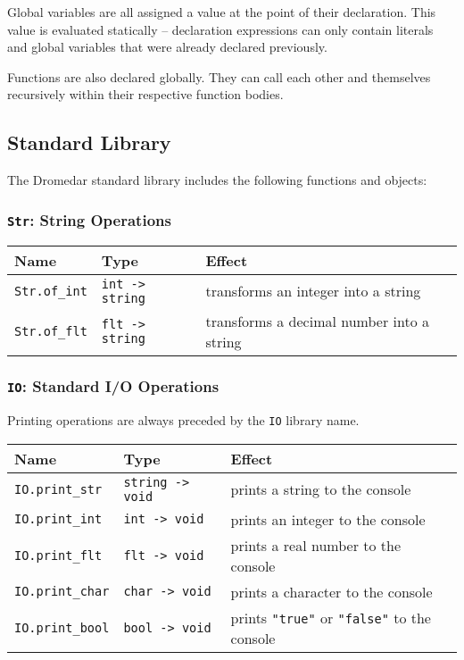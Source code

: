\documentclass{article}
\newcommand{\code}[1]{\lstinline[columns=fixed]{#1}}
\begin{document}
			Global variables are all assigned a value at the point of their declaration. This value is evaluated statically -- declaration expressions can only contain literals and global variables that were already declared previously.
			
			Functions are also declared globally. They can call each other and themselves recursively within their respective function bodies.
			
		\subsection{Standard Library}
		
			The Dromedar standard library includes the following functions and objects:
			
			\subsubsection{\code{Str}: String Operations}
			
				\begin{longtable}{l|l|l}
					\textbf{Name} & \textbf{Type} & \textbf{Effect} \\
					\midrule
					\code{Str.of_int} & \code{int -> string} & transforms an integer into a string \\
					\code{Str.of_flt} & \code{flt -> string} & transforms a decimal number into a string
				\end{longtable}
			
			\subsubsection{\code{IO}: Standard I/O Operations}
			
				Printing operations are always preceded by the \code{IO} library name.
			
				\begin{longtable}{l|l|l}
					\textbf{Name} & \textbf{Type} & \textbf{Effect} \\
					\midrule
					\code{IO.print_str} & \code{string -> void} & prints a string to the console\\
					\code{IO.print_int} & \code{int -> void} & prints an integer to the console\\
					\code{IO.print_flt} & \code{flt -> void} & prints a real number to the console\\
					\code{IO.print_char} & \code{char -> void} & prints a character to the console\\
					\code{IO.print_bool} & \code{bool -> void} & prints \code{"true"} or \code{"false"} to the console
				\end{longtable}
			
\end{document}
